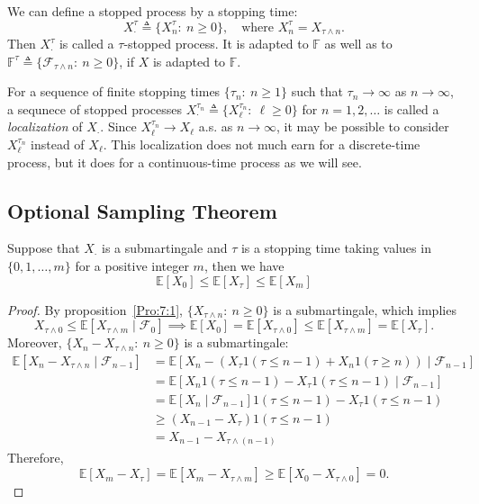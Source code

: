 We can define a stopped process by a stopping time:
\[
X_{\cdot}^\tau\triangleq \{X_n^\tau:~n\ge0\},\quad
\text{where }X_n^\tau=X_{\tau\land n}.
\]
Then $X_{\cdot}^\tau$ is called a $\tau$-stopped process.
It is adapted to $\mathbb{F}$ as well as to $\mathbb{F}^\tau\triangleq\{\mathcal{F}_{\tau\land n}:~n\ge0\}$, if $X$ is adapted to $\mathbb{F}$.

For a sequence of finite stopping times $\{\tau_n:~n\ge1\}$ such that $\tau_n\to\infty$ as $n\to\infty$,
a sequnece of stopped processes $X_{\cdot}^{\tau_n}\triangleq\{X_\ell^{\tau_n}:~\ell\ge0\}$ for $n=1,2,\ldots$ is called a \emph{localization} of $X_{\cdot}$.
Since $X_\ell^{\tau_n}\to X_{\ell}$ a.s. as $n\to\infty$, it may be possible to consider $X_\ell^{\tau_n}$ instead of $X_\ell$.
This localization does not much earn for a discrete-time process, but it does for a continuous-time process as we will see.

\subsection{Optional Sampling Theorem}

\begin{theorem}\label{The:7:1}
Suppose that $X_{\cdot}$ is a submartingale and $\tau$ is a stopping time taking values in 
$\{0,1,\ldots,m\}$ for a positive integer $m$, then we have
\[
\mathbb{E}[X_0]\le \mathbb{E}[X_\tau]\le \mathbb{E}[X_m]
\]
\end{theorem}

\begin{proof}
By proposition~\ref{Pro:7:1}, $\{X_{\tau\land n}:~n\ge0\}$ is a submartingale, which implies 
\[
X_{\tau\land 0}\le \mathbb{E}[X_{\tau\land m}\mid\mathcal{F}_0]\implies
\mathbb{E}[X_0]=\mathbb{E}[X_{\tau\land 0}]\le \mathbb{E}[X_{\tau\land m}]= \mathbb{E}[X_{\tau}].
\]
Moreover, $\{X_n - X_{\tau\land n}:~n\ge0\}$ is a submartingale:
\begin{align*}
\mathbb{E}[X_n - X_{\tau\land n}\mid\mathcal{F}_{n-1}]
&=\mathbb{E}[X_n - (X_\tau1(\tau\le n-1) + X_n1(\tau\ge n))\mid\mathcal{F}_{n-1}]\\
&=\mathbb{E}[X_n1(\tau\le n-1) - X_\tau1(\tau\le n-1)\mid\mathcal{F}_{n-1}]\\
&=\mathbb{E}[X_n\mid\mathcal{F}_{n-1}]1(\tau\le n-1) -  X_\tau1(\tau\le n-1)\\
&\ge(X_{n-1}-X_\tau)1(\tau\le n-1)\\
&=X_{n-1} - X_{\tau\land (n-1)}
\end{align*}
Therefore,
\[
\mathbb{E}[X_m - X_\tau] = \mathbb{E}[X_m - X_{\tau\land m}]\ge \mathbb{E}[X_0 - X_{\tau\land 0}]=0.
\]

\end{proof}

